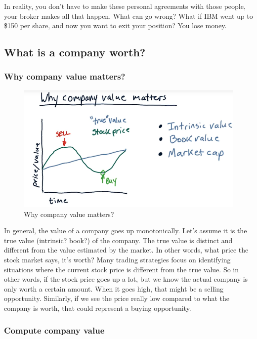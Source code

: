 \documentclass[12pt]{article}
\begin{document}
In reality, you don't have to make these personal agreements with those people, your broker makes all that happen. What can go wrong? What if IBM went up to \$150 per share, and now you want to exit your position? You lose money.

\subsection{What is a company worth?}

\subsubsection{Why company value matters?}

\begin{figure}[!ht]
\centering
\includegraphics[scale=0.45]{fig/fig34}
\caption{Why company value matters?}
\end{figure}

In general, the value of a company goes up monotonically. Let's assume it is the true value (intrinsic? book?) of the company. The true value is distinct and different from the value estimated by the market. In other words, what price the stock market says, it's worth? Many trading strategies focus on identifying situations where the current stock price is different from the true value. So in other words, if the stock price goes up a lot, but we know the actual company is only worth a certain amount. When it goes high, that might be a selling opportunity. Similarly, if we see the price really low compared to what the company is worth, that could represent a buying opportunity. 

\subsubsection{Compute company value}
\end{document}
